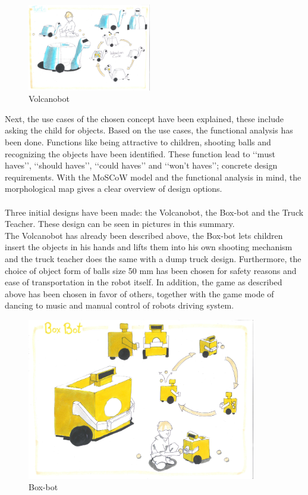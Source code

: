 \documentclass[11pt,twoside,a4paper]{report}
\begin{document}
\begin{figure}
  \begin{center}
    \includegraphics[width=0.48\textwidth]{Images/VolcanoBotConcept.pdf}
  \end{center}
  \caption{Volcanobot}
  \label{figure:boxbot}
\end{figure}
Next, the use cases of the chosen concept have been explained, these include asking the child for objects. Based on the use cases, the functional analysis has been done. Functions like being attractive to children, shooting balls and recognizing the objects have been identified.  These function lead to \lq\lq{}must haves\rq\rq{}, \lq\lq{}should haves\rq\rq{}, \lq\lq{}could haves\rq\rq{} and \lq\lq{}won\rq{}t haves\rq\rq{}; concrete design requirements. With the MoSCoW model and the functional analysis in mind, the morphological map gives a clear overview of design options.\\
 \\


Three initial designs have been made: the Volcanobot, the Box-bot and the Truck Teacher. These design can be seen in pictures in this summary.\\
 The Volcanobot has already been described above, the Box-bot lets children insert the objects in his hands and lifts them into his own shooting mechanism and the truck teacher does the same with a dump truck design. Furthermore, the choice of object form of balls size 50 mm has been chosen for safety reasons and ease of transportation in the robot itself. In addition, the game as described above has been chosen in favor of others, together with the game mode of dancing to music and manual control of robots driving system.
\begin{figure}[H]
\begin{center}
\includegraphics[width=10cm]{Images/BoxBotConcept.pdf}
\caption{Box-bot }
\label{figure:boxbotSumm}
\end{center}
\end{figure} 
\end{document}
